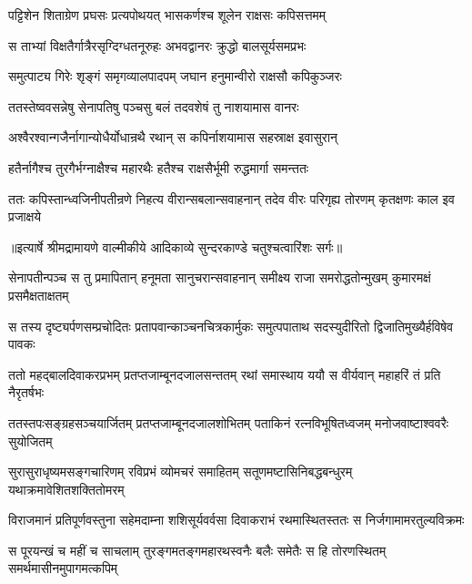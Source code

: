 \twolineshloka
{पट्टिशेन शिताग्रेण प्रघसः प्रत्यपोथयत्}
{भासकर्णश्च शूलेन राक्षसः कपिसत्तमम्} %

\twolineshloka
{स ताभ्यां विक्षतैर्गात्रैरसृग्दिग्धतनूरुहः}
{अभवद्वानरः क्रुद्धो बालसूर्यसमप्रभः} %

\twolineshloka
{समुत्पाट्य गिरेः शृङ्गं समृगव्यालपादपम्}
{जघान हनुमान्वीरो राक्षसौ कपिकुञ्जरः} %

\twolineshloka
{ततस्तेष्ववसन्नेषु सेनापतिषु पञ्चसु}
{बलं तदवशेषं तु नाशयामास वानरः} %

\twolineshloka
{अश्वैरश्वान्गजैर्नागान्योधैर्योधान्रथै रथान्}
{स कपिर्नाशयामास सहस्राक्ष इवासुरान्} %

\twolineshloka
{हतैर्नागैश्च तुरगैर्भग्नाक्षैश्च महारथैः}
{हतैश्च राक्षसैर्भूमी रुद्धमार्गा समन्ततः} %

\fourlineindentedshloka
{ततः कपिस्तान्ध्वजिनीपतीन्रणे}
{निहत्य वीरान्सबलान्सवाहनान्}
{तदेव वीरः परिगृह्य तोरणम्}
{कृतक्षणः काल इव प्रजाक्षये} %


{॥इत्यार्षे श्रीमद्रामायणे वाल्मीकीये आदिकाव्ये सुन्दरकाण्डे चतुश्चत्वारिंशः सर्गः॥}


\fourlineindentedshloka
{सेनापतीन्पञ्च स तु प्रमापितान्}
{हनूमता सानुचरान्सवाहनान्}
{समीक्ष्य राजा समरोद्धतोन्मुखम्}
{कुमारमक्षं प्रसमैक्षताक्षतम्} %

\fourlineindentedshloka
{स तस्य दृष्ट्यर्पणसम्प्रचोदितः}
{प्रतापवान्काञ्चनचित्रकार्मुकः}
{समुत्पपाताथ सदस्युदीरितो}
{द्विजातिमुख्यैर्हविषेव पावकः} %

\fourlineindentedshloka
{ततो महद्बालदिवाकरप्रभम्}
{प्रतप्तजाम्बूनदजालसन्ततम्}
{रथां समास्थाय ययौ स वीर्यवान्}
{महाहरिं तं प्रति नैरृतर्षभः} %

\fourlineindentedshloka
{ततस्तपःसङ्ग्रहसञ्चयार्जितम्}
{प्रतप्तजाम्बूनदजालशोभितम्}
{पताकिनं रत्नविभूषितध्वजम्}
{मनोजवाष्टाश्ववरैः सुयोजितम्} %

\fourlineindentedshloka
{सुरासुराधृष्यमसङ्गचारिणम्}
{रविप्रभं व्योमचरं समाहितम्}
{सतूणमष्टासिनिबद्धबन्धुरम्}
{यथाक्रमावेशितशक्तितोमरम्} %

\fourlineindentedshloka
{विराजमानं प्रतिपूर्णवस्तुना}
{सहेमदाम्ना शशिसूर्यवर्वसा}
{दिवाकराभं रथमास्थितस्ततः}
{स निर्जगामामरतुल्यविक्रमः} %

\fourlineindentedshloka
{स पूरयन्खं च महीं च साचलाम्}
{तुरङ्गमतङ्गमहारथस्वनैः}
{बलैः समेतैः स हि तोरणस्थितम्}
{समर्थमासीनमुपागमत्कपिम्} %


